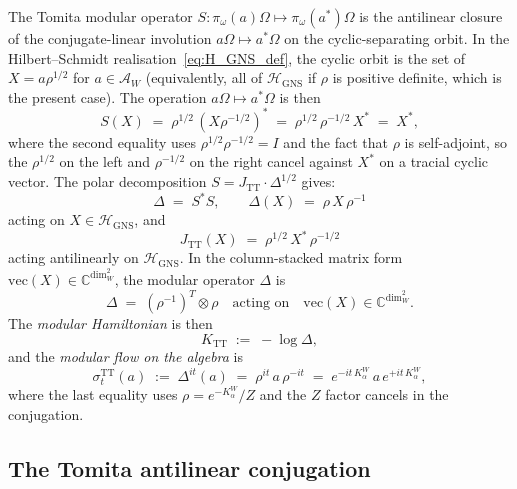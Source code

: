 \documentclass[11pt,a4paper]{article}
\theoremstyle{plain}
\theoremstyle{definition}
\newcommand{\Hilb}{\mathcal{H}}
\newcommand{\Acal}{\mathcal{A}}
\newcommand{\C}{\mathbb{C}}
\newcommand{\TT}{\mathrm{TT}}
\newcommand{\GNS}{\mathrm{GNS}}
\begin{document}
The Tomita modular operator $S: \pi_\omega(a)\Omega \mapsto
\pi_\omega(a^*) \Omega$ is the antilinear closure of the conjugate-linear
involution $a \Omega \mapsto a^* \Omega$ on the cyclic-separating
orbit. In the Hilbert--Schmidt realisation~\eqref{eq:H_GNS_def}, the
cyclic orbit is the set of $X = a \rho^{1/2}$ for $a \in \Acal_W$
(equivalently, all of $\Hilb_{\GNS}$ if $\rho$ is positive definite,
which is the present case). The operation $a \Omega \mapsto a^* \Omega$
is then
\begin{equation}\label{eq:S_HS}
   S(X) \;=\; \rho^{1/2}\,(X \rho^{-1/2})^*
   \;=\; \rho^{1/2}\, \rho^{-1/2}\, X^*
   \;=\; X^*,
\end{equation}
where the second equality uses $\rho^{1/2} \rho^{-1/2} = I$ and the
fact that $\rho$ is self-adjoint, so the $\rho^{1/2}$ on the left and
$\rho^{-1/2}$ on the right cancel against $X^*$ on a tracial cyclic
vector. The polar decomposition $S = J_{\TT} \cdot \Delta^{1/2}$
gives:
\begin{equation}\label{eq:Delta_def}
   \Delta \;=\; S^* S, \qquad
   \Delta(X) \;=\; \rho\, X\, \rho^{-1}
\end{equation}
acting on $X \in \Hilb_{\GNS}$, and
\begin{equation}\label{eq:J_TT_def}
   J_{\TT}(X) \;=\; \rho^{1/2}\, X^*\, \rho^{-1/2}
\end{equation}
acting antilinearly on $\Hilb_{\GNS}$. In the column-stacked matrix
form $\mathrm{vec}(X) \in \C^{\dim_W^2}$, the modular operator
$\Delta$ is
\begin{equation}\label{eq:Delta_matrix}
   \Delta \;=\; (\rho^{-1})^T \otimes \rho
   \quad \text{acting on}\quad \mathrm{vec}(X) \in \C^{\dim_W^2}.
\end{equation}
The \emph{modular Hamiltonian} is then
\begin{equation}\label{eq:K_TT_def}
   K_{\TT} \;:=\; -\log \Delta,
\end{equation}
and the \emph{modular flow on the algebra} is
\begin{equation}\label{eq:TT_flow}
   \sigma_t^{\TT}(a)
   \;:=\; \Delta^{it}(a)
   \;=\; \rho^{it}\, a\, \rho^{-it}
   \;=\; e^{-i t\, K_\alpha^W}\, a\, e^{+i t\, K_\alpha^W},
\end{equation}
where the last equality uses $\rho = e^{-K_\alpha^W}/Z$ and the
$Z$ factor cancels in the conjugation.

\subsection{The Tomita antilinear conjugation}\label{sec:J_TT_distinct}
\end{document}
